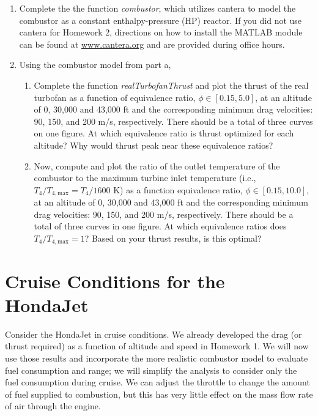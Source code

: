 \documentclass[11pt]{article}
\begin{document}
\begin{enumerate}[label=(\alph*)]
	\item Complete the the function \emph{combustor}, which utilizes cantera to model the combustor as a constant enthalpy-pressure (HP) reactor. If you did not use cantera for Homework 2, directions on how to install the MATLAB module can be found at \href{http://www.cantera.org/docs/sphinx/html/install.html}{www.cantera.org} and are provided during office hours.
    
    \item Using the combustor model from part a, 
    \begin{enumerate}[label=(\roman*)]
    	\item
        	Complete the function \emph{realTurbofanThrust} and plot the thrust of the real turbofan as a function of equivalence ratio, $\phi\in[0.15,5.0]$, at an altitude of 0, 30,000 and 43,000 ft and the corresponding minimum drag velocities: 90, 150, and 200 m/s, respectively. There should be a total of three curves on one figure. At which equivalence ratio is thrust optimized for each altitude? Why would thrust peak near these equivalence ratios?
    	\item 
        	Now, compute and plot the ratio of the outlet temperature of the combustor to the maximum turbine inlet temperature (i.e., $T_4/T_{4,\mathrm{max}}=T_4/1600$ K) as a function equivalence ratio, $\phi\in[0.15,10.0]$, at an altitude of 0, 30,000 and 43,000 ft and the corresponding minimum drag velocities: 90, 150, and 200 m/s, respectively. There should be a total of three curves in one figure. At which equivalence ratios does $T_4/T_{4,\mathrm{max}}=1$? Based on your thrust results, is this optimal? 
    \end{enumerate}
\end{enumerate}
\section{Cruise Conditions for the HondaJet}
Consider the HondaJet in cruise conditions. We already developed the drag (or thrust required) as a function of altitude and speed in Homework 1. We will now use those results and incorporate the more realistic combustor model to evaluate fuel consumption and range; we will simplify the analysis to consider only the fuel consumption during cruise. We can adjust the throttle to change the amount of fuel supplied to combustion, but this has very little effect on the mass flow rate of air through the engine.
\end{document}

